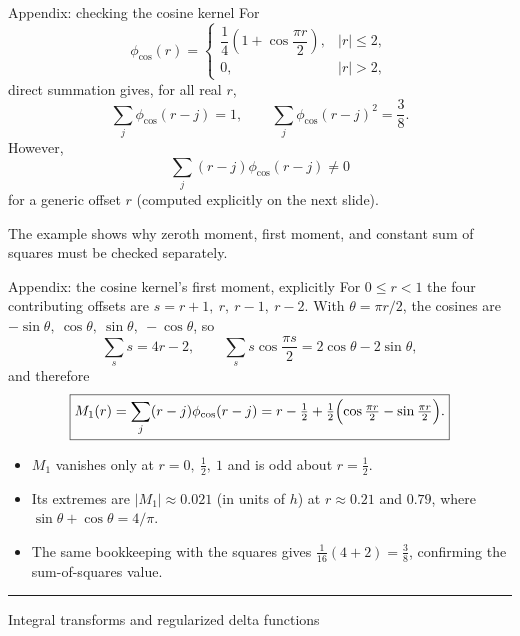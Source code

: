 \documentclass[aspectratio=169,11pt]{beamer}
\begin{document}
\begin{frame}{Appendix: checking the cosine kernel}
\setlength{\abovedisplayskip}{5pt}\setlength{\belowdisplayskip}{5pt}%
For
\[
  \phi_{\cos}(r)=
  \begin{cases}
  \dfrac14\left(1+\cos\dfrac{\pi r}{2}\right),&|r|\le2,\\[4pt]
  0,&|r|>2,
  \end{cases}
\]
direct summation gives, for all real \(r\),
\[
  \sum_j\phi_{\cos}(r-j)=1,
  \qquad
  \sum_j\phi_{\cos}(r-j)^2=\frac38.
\]
However,
\[
  \sum_j(r-j)\phi_{\cos}(r-j)\ne0
\]
for a generic offset \(r\) (computed explicitly on the next slide).

\begin{punchbox}
The example shows why zeroth moment, first moment, and constant sum of squares must be checked separately.
\end{punchbox}
\end{frame}

\begin{frame}{Appendix: the cosine kernel's first moment, explicitly}
For \(0\le r<1\) the four contributing offsets are \(s=r+1,\ r,\ r-1,\ r-2\). With \(\theta=\pi r/2\), the cosines are \(-\sin\theta,\ \cos\theta,\ \sin\theta,\ -\cos\theta\), so
\[
  \sum_s s=4r-2,\qquad \sum_s s\cos\frac{\pi s}{2}=2\cos\theta-2\sin\theta,
\]
and therefore
\[
  \boxed{M_1(r)=\sum_j(r-j)\phi_{\cos}(r-j)=r-\tfrac12+\tfrac12\Bigl(\cos\tfrac{\pi r}{2}-\sin\tfrac{\pi r}{2}\Bigr).}
\]
\begin{itemize}\itemsep4pt
  \item \(M_1\) vanishes only at \(r=0,\ \tfrac12,\ 1\) and is odd about \(r=\tfrac12\).
  \item Its extremes are \(|M_1|\approx0.021\) (in units of \(h\)) at \(r\approx0.21\) and \(0.79\), where \(\sin\theta+\cos\theta=4/\pi\).
  \item The same bookkeeping with the squares gives \(\tfrac1{16}(4+2)=\tfrac38\), confirming the sum-of-squares value.
\end{itemize}
\end{frame}

\begin{frame}[plain]
\centering
\vfill
{\par}

\medskip
{\color{DarkGray}\rule{0.34\textwidth}{0.8pt}}

\medskip
{\small Integral transforms and regularized delta functions}
\vfill
\end{frame}
\end{document}
